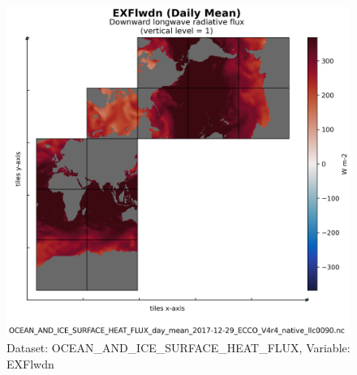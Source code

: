 \begin{figure}[H]
\centering
\includegraphics[scale=0.55]{../images/plots/native_plots/Ocean_and_Sea-Ice_Surface_Heat_Fluxes/EXFlwdn.png}
\caption{Dataset: OCEAN\_AND\_ICE\_SURFACE\_HEAT\_FLUX, Variable: EXFlwdn}
\label{tab:table-OCEAN_AND_ICE_SURFACE_HEAT_FLUX_EXFlwdn-Plot}
\end{figure}
\newpage
\pagebreak
